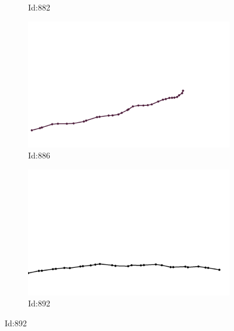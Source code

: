\documentclass[12pt,twoside]{report}
\begin{document}
\begin{figure}
\begin{subfigure}[b]{0.20\textwidth}
\caption{Id:882}
\end{subfigure}
\begin{subfigure}[b]{0.20\textwidth}
\centering
\includegraphics[width=\textwidth]{../trajectories/886.png}
\caption{Id:886}
\end{subfigure}
\begin{subfigure}[b]{0.20\textwidth}
\centering
\includegraphics[width=\textwidth]{../trajectories/892.png}
\caption{Id:892}
\end{subfigure}
\end{figure}
\end{document}
